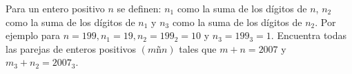 Para un entero positivo $n$ se definen: $n_1$ como la suma de los dígitos de $n$, $n_2$ como la suma de los dígitos de $n_1$ y $n_3$ como la suma de los dígitos de $n_2$. Por ejemplo para $n=199,n_1=19,n_2=199_2=10$ y $n_3=199_3=1$. Encuentra todas las parejas de enteros positivos $(mñn)$ tales que $m+n=2007$ y $m_3+n_2=2007_3$.